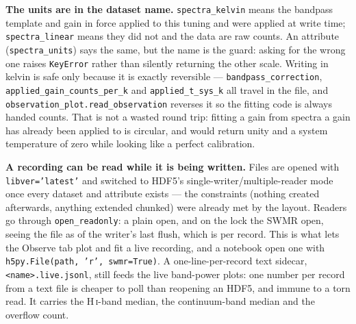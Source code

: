 \documentclass[11pt,a4paper]{article}
\begin{document}
\textbf{The units are in the dataset name.} \texttt{spectra\_kelvin} means the bandpass template and gain in force applied to this tuning and were applied at write time; \texttt{spectra\_linear} means they did not and the data are raw counts. An attribute (\texttt{spectra\_units}) says the same, but the name is the guard: asking for the wrong one raises \texttt{KeyError} rather than silently returning the other scale. Writing in kelvin is safe only because it is exactly reversible --- \texttt{bandpass\_correction}, \texttt{applied\_gain\_counts\_per\_k} and \texttt{applied\_t\_sys\_k} all travel in the file, and \texttt{observation\_plot.read\_observation} reverses it so the fitting code is always handed counts. That is not a wasted round trip: fitting a gain from spectra a gain has already been applied to is circular, and would return unity and a system temperature of zero while looking like a perfect calibration.

\textbf{A recording can be read while it is being written.} Files are opened with \texttt{libver='latest'} and switched to HDF5's single-writer/multiple-reader mode once every dataset and attribute exists --- the constraints (nothing created afterwards, anything extended chunked) were already met by the layout. Readers go through \texttt{open\_readonly}: a plain open, and on the lock the SWMR open, seeing the file as of the writer's last flush, which is per record. This is what lets the Observe tab plot and fit a live recording, and a notebook open one with \texttt{h5py.File(path, 'r', swmr=True)}. A one-line-per-record text sidecar, \texttt{<name>.live.jsonl}, still feeds the live band-power plots: one number per record from a text file is cheaper to poll than reopening an HDF5, and immune to a torn read. It carries the H\,\textsc{i}-band median, the continuum-band median and the overflow count.
\end{document}
